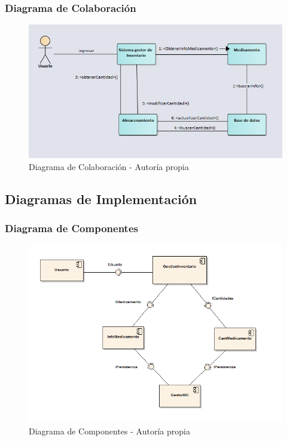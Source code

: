 \newpage


\subsubsection{ Diagrama de Colaboración}
\begin{center}
    \begin{figure}[htb]
        \centering
        \includegraphics[width = 1.2\linewidth] {libro/capitulo5/img/Colaboracion.PNG}
        \caption{Diagrama de Colaboración - Autor\'ia propia}
        \label{fig:my_label}
    \end{figure}
\end{center}
\newpage

\subsection{ Diagramas de Implementación}
\subsubsection{ Diagrama de Componentes}
\begin{center}
    \begin{figure}[htb]
        \centering
        \includegraphics[width = 0.8\linewidth] {libro/capitulo5/img/Componentes.PNG}
        \caption{Diagrama de Componentes - Autor\'ia propia}
        \label{fig:my_label}
    \end{figure}
\end{center}
